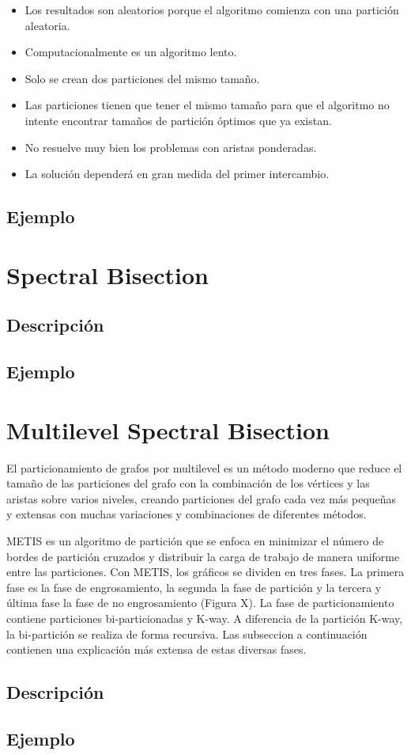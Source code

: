 \begin{itemize}
	\item Los resultados son aleatorios porque el algoritmo comienza con una partición aleatoria.
	\item Computacionalmente es un algoritmo lento.
	\item Solo se crean dos particiones del mismo tamaño.
	\item Las particiones tienen que tener el mismo tamaño para que el algoritmo no intente encontrar tamaños de partición óptimos que ya existan.
	\item No resuelve muy bien los problemas con aristas ponderadas.
	\item La solución dependerá en gran medida del primer intercambio.
\end{itemize}

\subsection{Ejemplo}

\section{Spectral Bisection}\label{Spectral-Bisection}

\subsection{Descripción}

\subsection{Ejemplo}

\section{Multilevel Spectral Bisection}\label{Multilevel-Spectral-Bisection}

El particionamiento de grafos por multilevel es un método moderno que reduce el tamaño de las particiones del grafo con la combinación de los vértices y las aristas sobre varios niveles, creando particiones del grafo cada vez más pequeñas y extensas con muchas variaciones y combinaciones de diferentes métodos.

METIS es un algoritmo de partición que se enfoca en minimizar el número de bordes de partición cruzados y distribuir la carga de trabajo de manera uniforme entre las particiones. Con METIS, los gráficos se dividen en tres fases. La primera fase es la fase de engrosamiento, la segunda la fase de partición y la tercera y última fase la fase de no engrosamiento (Figura X). La fase de particionamiento contiene particiones bi-particionadas y K-way. A diferencia de la partición K-way, la bi-partición se realiza de forma recursiva. Las subseccion a continuación contienen una explicación más extensa de estas diversas fases.

\subsection{Descripción}

\subsection{Ejemplo}

